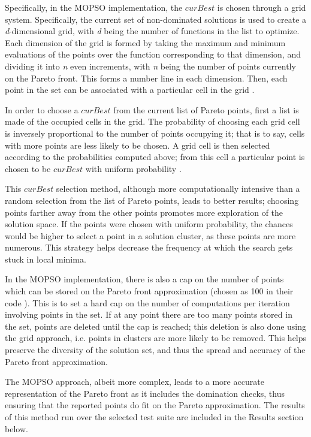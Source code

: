 \documentclass[letterpaper, 10 pt, conference]{ieeeconf}  %
\begin{document}
Specifically, in the MOPSO implementation, the $curBest$ is chosen through a grid system.  Specifically, the current set of non-dominated solutions is used to create a \textit{d}-dimensional grid, with \textit{d} being the number of functions in the list to optimize.  Each dimension of the grid is formed by taking the maximum and minimum evaluations of the points over the function corresponding to that dimension, and dividing it into \textit{n} even increments, with \textit{n} being the number of points currently on the Pareto front.  This forms a number line in each dimension.  Then, each point in the set can be associated with a particular cell in the grid \cite{MOPSOCode}.

In order to choose a $curBest$ from the current list of Pareto points, first a list is made of the occupied cells in the grid.  The probability of choosing each grid cell is inversely proportional to the number of points occupying it; that is to say, cells with more points are less likely to be chosen.  A grid cell is then selected according to the probabilities computed above; from this cell a particular point is chosen to be $curBest$ with uniform probability \cite{MOPSOCode}.  

This $curBest$ selection method, although more computationally intensive than a random selection from the list of Pareto points, leads to better results; choosing points farther away from the other points promotes more exploration of the solution space.  If the points were chosen with uniform probability, the chances would be higher to select a point in a solution cluster, as these points are more numerous.  This strategy helps decrease the frequency at which the search gets stuck in local minima.

In the MOPSO implementation, there is also a cap on the number of points which can be stored on the Pareto front approximation (chosen as 100 in their code \cite{MOPSOCode}).  This is to set a hard cap on the number of computations per iteration involving points in the set.  If at any point there are too many points stored in the set, points are deleted until the cap is reached; this deletion is also done using the grid approach, i.e. points in clusters are more likely to be removed.  This helps preserve the diversity of the solution set, and thus the spread and accuracy of the Pareto front approximation.  

The MOPSO approach, albeit more complex, leads to a more accurate representation of the Pareto front as it includes the domination checks, thus ensuring that the reported points do fit on the Pareto approximation.  The results of this method run over the selected test suite are included in the Results section below. 
\end{document}
